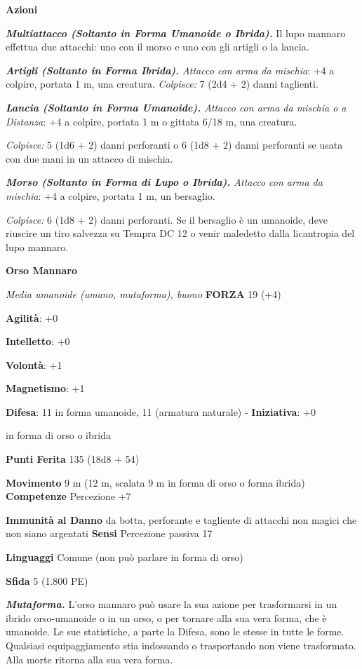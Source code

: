 \begin{multicols}{2}
\smallskip\textbf{Azioni}

\emph{\textbf{Multiattacco (Soltanto in Forma Umanoide o Ibrida).}} Il
lupo mannaro effettua due attacchi: uno con il morso e uno con gli
artigli o la lancia.

\emph{\textbf{Artigli (Soltanto in Forma Ibrida).} Attacco con arma da
mischia}: +4 a colpire, portata 1 m, una creatura. \emph{Colpisce:} 7
(2d4 + 2) danni taglienti.

\emph{\textbf{Lancia (Soltanto in Forma Umanoide).} Attacco con arma da
mischia o a Distanza}: +4 a colpire, portata 1 m o gittata 6/18 m, una
creatura.

\emph{Colpisce:} 5 (1d6 + 2) danni perforanti o 6 (1d8 + 2) danni
perforanti se usata con due mani in un attacco di mischia.

\emph{\textbf{Morso (Soltanto in Forma di Lupo o Ibrida).} Attacco con
arma da mischia}: +4 a colpire, portata 1 m, un bersaglio.

\emph{Colpisce:} 6 (1d8 + 2) danni perforanti. Se il bersaglio è un
umanoide, deve riuscire un tiro salvezza su Tempra DC 12 o venir
maledetto dalla licantropia del lupo mannaro.

\textbf{Orso Mannaro}

\emph{Media umanoide (umano, mutaforma), buono} \textbf{FORZA}
19 (+4)

\textbf{Agilità}: +0

\textbf{Intelletto}: +0

\textbf{Volontà}: +1

\textbf{Magnetismo}: +1

\textbf{Difesa}: 11 in forma umanoide, 11 (armatura naturale) - \textbf{Iniziativa}: +0

in forma di orso o ibrida

\textbf{Punti Ferita} 135 (18d8 + 54)

\textbf{Movimento} 9 m (12 m, scalata 9 m in forma di orso o forma
ibrida) \textbf{Competenze} Percezione +7

\textbf{Immunità al Danno} da botta, perforante e tagliente di
attacchi non magici che non siano argentati \textbf{Sensi} Percezione
passiva 17

\textbf{Linguaggi} Comune (non può parlare in forma di orso)

\textbf{Sfida} 5 (1.800 PE)\smallskip

\emph{\textbf{Mutaforma.}} L'orso mannaro può usare la sua azione per
trasformarsi in un ibrido orso-umanoide o in un orso, o per tornare alla
sua vera forma, che è umanoide. Le sue statistiche, a parte la Difesa, sono
le stesse in tutte le forme. Qualsiasi equipaggiamento stia indossando o
trasportando non viene trasformato. Alla morte ritorna alla sua vera
forma.


\end{multicols}
